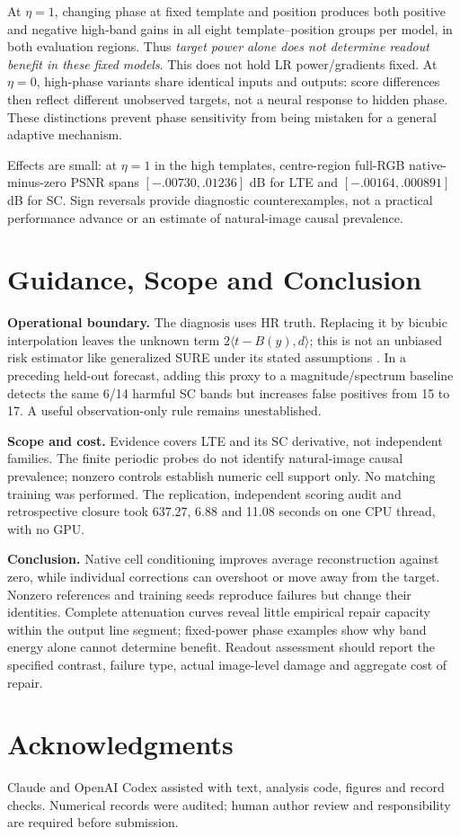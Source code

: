 At $\eta=1$, changing phase at fixed template and position produces both
positive and negative high-band gains in all eight template--position
groups per model, in both evaluation regions. Thus \emph{target power
alone does not determine readout benefit in these fixed models}.
This does not hold LR power/gradients fixed. At $\eta=0$, high-phase
variants share identical inputs and outputs: score differences then
reflect different unobserved targets, not a neural response to hidden
phase. These distinctions prevent phase sensitivity from being mistaken
for a general adaptive mechanism.

Effects are small: at $\eta=1$ in the high templates, centre-region
full-RGB native-minus-zero PSNR spans $[-.00730,.01236]$ dB for LTE and
$[-.00164,.000891]$ dB for SC. Sign reversals provide diagnostic
counterexamples, not a practical performance advance or an estimate
of natural-image causal prevalence.

\section{Guidance, Scope and Conclusion}
\label{sec:limits}
\textbf{Operational boundary.}
The diagnosis uses HR truth. Replacing it by bicubic interpolation leaves
the unknown term $2\langle t-B(y),d\rangle$; this is not an unbiased
risk estimator like generalized SURE under its stated assumptions
\cite{eldar2008gsure}. In a preceding held-out forecast, adding this proxy
to a magnitude/spectrum baseline detects the same 6/14 harmful SC bands
but increases false positives from 15 to 17. A useful observation-only
rule remains unestablished.

\textbf{Scope and cost.}
Evidence covers LTE and its SC derivative, not independent families.
The finite periodic probes do not identify natural-image causal prevalence;
nonzero controls establish numeric cell support only. No matching training
was performed. The replication, independent scoring audit and retrospective
closure took 637.27, 6.88 and 11.08 seconds on one CPU thread, with no GPU.

\textbf{Conclusion.}
Native cell conditioning improves average reconstruction against zero,
while individual corrections can overshoot or move away from the target.
Nonzero references and training seeds reproduce failures but change their
identities. Complete attenuation curves reveal little empirical repair
capacity within the output line segment; fixed-power phase examples show
why band energy alone cannot determine benefit. Readout assessment should
report the specified contrast, failure type, actual image-level damage and
aggregate cost of repair.

\section{Acknowledgments}
Claude and OpenAI Codex assisted with text, analysis code, figures and
record checks. Numerical records were audited; human author review and
responsibility are required before submission.
